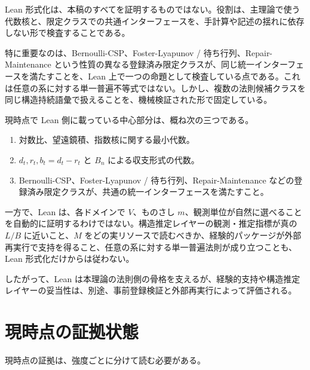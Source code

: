 \documentclass[12pt,a4paper]{article}
\begin{document}
Lean 形式化は、本稿のすべてを証明するものではない。役割は、主理論で使う代数核と、限定クラスでの共通インターフェースを、手計算や記述の揺れに依存しない形で検査することである。

特に重要なのは、Bernoulli-CSP、Foster-Lyapunov / 待ち行列、Repair-Maintenance という性質の異なる登録済み限定クラスが、同じ統一インターフェースを満たすことを、Lean 上で一つの命題として検査している点である。これは任意の系に対する単一普遍不等式ではない。しかし、複数の法則候補クラスを同じ構造持続語彙で扱えることを、機械検証された形で固定している。

現時点で Lean 側に載っている中心部分は、概ね次の三つである。

\begin{enumerate}
\def\labelenumi{\arabic{enumi}.}
\tightlist
\item
  対数比、望遠鏡積、指数核に関する最小代数。
\item
  \(d_{t},r_{t},b_{t}=d_{t}-r_{t}\) と \(B_{n}\) による収支形式の代数。
\item
  Bernoulli-CSP、Foster-Lyapunov / 待ち行列、Repair-Maintenance などの登録済み限定クラスが、共通の統一インターフェースを満たすこと。
\end{enumerate}

一方で、Lean は、各ドメインで \(V\)、ものさし \(m\)、観測単位が自然に選べることを自動的に証明するわけではない。構造推定レイヤーの観測・推定指標が真の \(L/B\) に近いこと、\(M\) をどの実リソースで読むべきか、経験的パッケージが外部再実行で支持を得ること、任意の系に対する単一普遍法則が成り立つことも、Lean 形式化だけからは従わない。

したがって、Lean は本理論の法則側の骨格を支えるが、経験的支持や構造推定レイヤーの妥当性は、別途、事前登録検証と外部再実行によって評価される。

\section{現時点の証拠状態}\label{ux73feux6642ux70b9ux306eux8a3cux62e0ux72b6ux614b}

現時点の証拠は、強度ごとに分けて読む必要がある。
\end{document}
